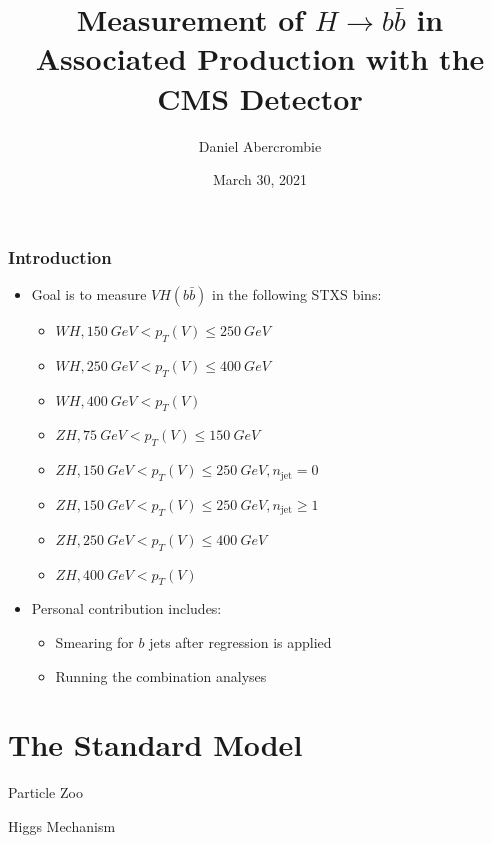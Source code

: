 \documentclass{beamer}
\author[D. Abercrombie]{
  Daniel Abercrombie
}
\title{\bf \sffamily Measurement of $H\rightarrow b\bar{b}$ in \\ Associated Production with the CMS Detector}
\date{March 30, 2021}
\begin{document}
\begin{frame}
  \titlepage
\end{frame}

\begin{frame}
  \frametitle{Introduction}

  \begin{itemize}
  \item Goal is to measure $VH(b\bar{b})$ in the following STXS bins:
    \begin{itemize}
    \item $WH, \SI{150}{GeV} < p_T(V) \le \SI{250}{GeV}$
    \item $WH, \SI{250}{GeV} < p_T(V) \le \SI{400}{GeV}$
    \item $WH, \SI{400}{GeV} < p_T(V)$
    \item $ZH, \SI{75}{GeV} < p_T(V) \le \SI{150}{GeV}$
    \item $ZH, \SI{150}{GeV} < p_T(V) \le \SI{250}{GeV}, n_\mathrm{jet} = 0$
    \item $ZH, \SI{150}{GeV} < p_T(V) \le \SI{250}{GeV}, n_\mathrm{jet} \ge 1$
    \item $ZH, \SI{250}{GeV} < p_T(V) \le \SI{400}{GeV}$
    \item $ZH, \SI{400}{GeV} < p_T(V)$
    \end{itemize}
  \item Personal contribution includes:
    \begin{itemize}
    \item Smearing for $b$ jets after regression is applied
    \item Running the combination analyses
    \end{itemize}
  \end{itemize}

\end{frame}

\section{The Standard Model}

\begin{frame}

  Particle Zoo

\end{frame}

\begin{frame}

  Higgs Mechanism

\end{frame}
\end{document}
